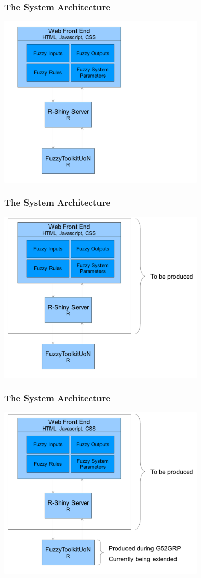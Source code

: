 \documentclass{beamer}
\begin{document}
\begin{frame}
	\frametitle{The System Architecture}
	\begin{center}
	\includegraphics[width=0.75\textwidth]{images/Picture4.png}
	\end{center}
\end{frame}
\begin{frame}
	\frametitle{The System Architecture}
	\begin{center}
	\includegraphics[width=0.75\textwidth]{images/Picture5.png}
	\end{center}
\end{frame}
\begin{frame}
	\frametitle{The System Architecture}
	\begin{center}
	\includegraphics[width=0.75\textwidth]{images/Picture6.png}
	\end{center}
\end{frame}
\end{document}
